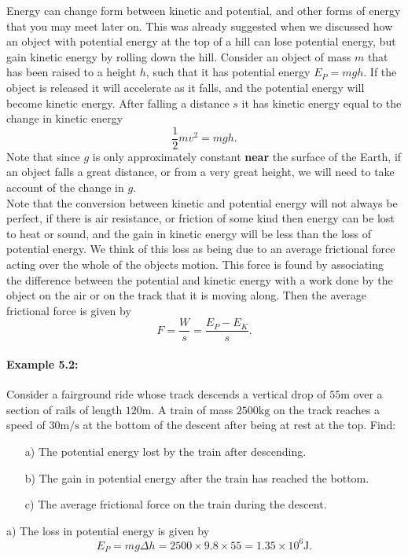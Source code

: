 \documentclass[a4paper,12pt]{book}
\begin{document}
Energy can change form between kinetic and potential, and other forms of energy that you may meet later on.  This was already suggested when we discussed how an object with potential energy at the top of a hill can lose potential energy, but gain kinetic energy by rolling down the hill. Consider an object of mass $m$ that has been raised to a height $h$, such that it has potential energy $E_{P}=mgh$. If the object is released it will accelerate as it falls, and the potential energy will become kinetic energy. After falling a distance $s$ it has kinetic energy equal to the change in kinetic energy
\begin{equation*}
\frac{1}{2}mv^{2}=mg h.
\end{equation*}
Note that since $g$ is only approximately constant \textbf{near} the surface of the Earth, if an object falls a great distance, or from a very great height, we will need to take account of the change in $g$.\\

Note that the conversion between kinetic and potential energy will not always be perfect, if there is air resistance, or friction of some kind then energy can be lost to heat or sound, and the gain in kinetic energy will be less than the loss of potential energy. We think of this loss as being due to an average frictional force acting over the whole of the objects motion. This force is found by associating the difference between the potential and kinetic energy with a work done by the object on the air or on the track that it is moving along. Then the average frictional force is given by
\begin{equation*}
F=\frac{W}{s}=\frac{E_{P}-E_{K}}{s}.
\end{equation*}

\paragraph{Example 5.2:} Consider a fairground ride whose track descends a vertical drop of $55\text{m}$ over a section of rails of length $120\text{m}$. A train of mass $2500\text{kg}$ on the track reaches a speed of $30\text{m/s}$ at the bottom of the descent after being at rest at the top. Find:
\begin{itemize}
\setlength{\itemsep}{-5pt}
    \item[a)] The potential energy lost by the train after descending.
    \item[b)] The gain in potential energy after the train has reached the bottom.
    \item[c)] The average frictional force on the train during the descent.
\end{itemize} 
a) The loss in potential energy is given by
\begin{equation*}
E_{P}=mg\Delta h=2500\times 9.8\times 55=1.35\times 10^{6}\text{J}.
\end{equation*}
\end{document}
